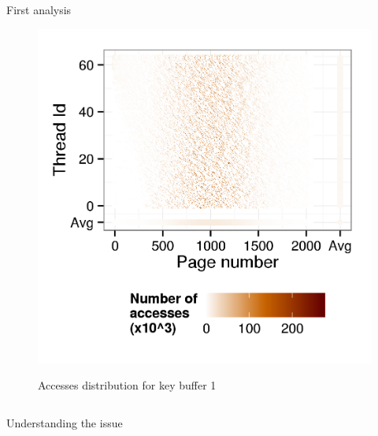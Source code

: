 \documentclass[xcolor={usenames,dvipsnames},hyperref={pdfusetitle}]{beamer}
\begin{document}
\begin{frame}{First analysis}
\begin{figure}[htb]
\begin{columns}
\begin{column}{.45\linewidth}
            \includegraphics[width=\linewidth]  {tabarnac/is_b_kb1_orig}
            \begin{block}{}
                \centering
                Accesses distribution for key buffer 1
            \end{block}
        \end{column}
    \end{columns}
\end{figure}

\end{frame}

\begin{frame}{Understanding the issue}
    \pause
\end{frame}
\end{document}
